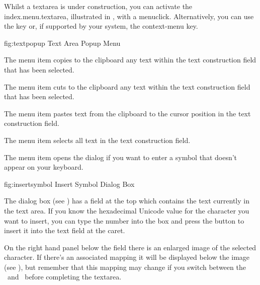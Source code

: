
Whilst a \gls{textarea} is under construction, you can activate the
\gls{index.menu.textarea}, illustrated in
, with a \gls{menuclick}. Alternatively,
you can use the  key or, if supported by your
system, the  \gls{context-menu} key.

\FloatFig
  {fig:textpopup}
  {}
  {Text Area Popup Menu}


The  menu item copies to the clipboard any text within 
the text construction field that has been selected.


The  menu item cuts to the clipboard any text within 
the text construction field that has been selected.


The  menu item pastes text from the
clipboard to the cursor position in the text construction field.


The  menu item selects all text in 
the text construction field.


The  menu item 
opens the  dialog  if you want to
enter a symbol that doesn't appear on your keyboard. 


\FloatFig
  {fig:insertsymbol}
  {}
  {Insert Symbol Dialog Box}

The  dialog box (see )
has a field at the top which contains the text currently in the text
area. If you know the hexadecimal Unicode value for the character
you want to insert, you can type the number into the
 box and press the
  button to
insert it into the text field at the caret. 

On the right hand panel below the  field
there is an enlarged image of the selected character. If there's an
associated mapping it will be displayed below the image
(see ), but remember that this mapping
may change if you switch between the \texttool\ and \mathstool\ before
completing the \gls{textarea}.

